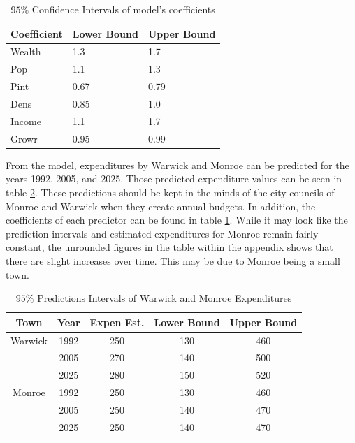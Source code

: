 \documentclass{article}\usepackage[]{graphicx}\usepackage[]{color}
\begin{document}
\begin{table}[h!]
  \begin{center}
    \caption{$95 \%$ Confidence Intervals of model's coefficients}
    \label{coefficients}
    \begin{tabular}{l|l|l} 
      \textbf{Coefficient} & \textbf{Lower Bound} & \textbf{Upper Bound}\\
      \hline
      Wealth   &  1.3 & 1.7 \\
      Pop       &  1.1 & 1.3 \\
      Pint       &  0.67 & 0.79 \\
      Dens      &  0.85 & 1.0\\
      Income  &   1.1 & 1.7 \\
      Growr    & 0.95 & 0.99 \\
      
    \end{tabular}
  \end{center}
\end{table}

\qquad From the model, expenditures by Warwick and Monroe can be predicted for the years 1992, 2005, and 2025. Those predicted expenditure values can be seen in table \ref{predictions}. These predictions should be kept in the minds of the city councils of Monroe and Warwick when they create annual budgets. In addition, the coefficients of each predictor can be found in table \ref{coefficients}. While it may look like the prediction intervals and estimated expenditures for Monroe remain fairly constant, the unrounded figures in the table within the appendix shows that there are slight increases over time. This may be due to Monroe being a small town. 
\begin{table}[h!]
  \begin{center}
    \caption{$95 \%$ Predictions Intervals of Warwick and Monroe Expenditures}
    \label{predictions}
    \begin{tabular}{c | c | c | c | c} \hline
      \textbf{Town} & \textbf{Year} & \textbf{Expen Est.} & \textbf{Lower Bound} & \textbf{Upper Bound}\\
      \hline
     Warwick & 1992 & 250 & 130 & 460 \\
                  & 2005 & 270 & 140 & 500 \\
                  & 2025 & 280 & 150 & 520 \\
                  \hline
	Monroe & 1992 & 250 & 130 & 460 \\
		     & 2005 & 250 & 140 & 470 \\
		     & 2025 & 250 & 140 & 470 \\
      
    \end{tabular}
  \end{center}
\end{table}
\end{document}
